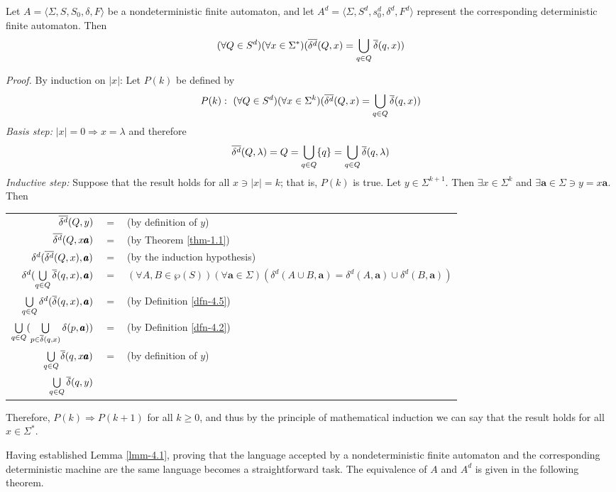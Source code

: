 \begin{lmm}\label{lmm-4.1}
Let $A=\langle\Sigma,S,S_0,\delta,F\rangle$ be a nondeterministic finite
automaton, and let $A^d=\langle\Sigma,S^d,s^d_0,\delta^d,F^d\rangle$ represent
the corresponding deterministic finite automaton. Then
\[ (\forall Q \in S^d)(\forall x \in \Sigma^*)(\overline{\delta^{d}}(Q,x) =
	\bigcup\limits_{q\in Q} \overline{\delta}(q,x)) \]

\emph{Proof.} By induction on $|x|$: Let $P(k)$ be defined by
\[ P(k):\ (\forall Q \in S^d)(\forall x \in \Sigma^k)(\overline{\delta^{d}}(Q,x) =
	\bigcup\limits_{q\in Q} \overline{\delta}(q,x)) \]
\emph{Basis step:} $|x| = 0 \Rightarrow x = \lambda$ and therefore
\[ \overline{\delta^{d}}(Q,\lambda) = Q = \bigcup\limits_{q\in Q}\{q\} = 
	\bigcup\limits_{q\in Q}\overline{\delta}(q,\lambda) \]
\emph{Inductive step:} Suppose that the result holds for all $x \ni |x| = k$;
that is, $P(k)$ is true. Let $y \in \Sigma^{k+1}$. Then $\exists x \in \Sigma^k$
and $\exists \pmb{a} \in \Sigma \ni y = x\pmb{a}$. Then
\begin{center}\begin{tabular}{rcl}
$\overline{\delta^{d}}(Q,y)$ & $=$ & (by definition of $y$) \\
$\overline{\delta^{d}}(Q,x\pmb{a})$ & $=$ & (by Theorem \ref{thm-1.1}) \\
$\delta^d(\overline{\delta^{d}}(Q,x),\pmb{a})$ & $=$ & (by the induction hypothesis) \\
$\delta^d(\bigcup\limits_{q\in Q}\overline{\delta}(q,x),\pmb{a})$ & $=$ & $(\forall A,B
	\in \wp(S))(\forall\pmb{a}\in\Sigma)(\delta^d(A \cup B,\pmb{a}) =
	\delta^d(A,\pmb{a}) \cup \delta^d(B,\pmb{a}))$ \\
$\bigcup\limits_{q\in Q}\delta^d(\overline{\delta}(q,x),\pmb{a})$ & $=$ &
	(by Definition \ref{dfn-4.5}) \\
$\bigcup\limits_{q\in Q}(\bigcup\limits_{p\in \overline{\delta}(q,x)}\delta
	(p,\pmb{a}))$ & $=$ & (by Definition \ref{dfn-4.2}) \\
$\bigcup\limits_{q\in Q}\overline{\delta}(q,x\pmb{a})$ & $=$ & (by definition of $y$) \\
$\bigcup\limits_{q\in Q} \overline{\delta}(q,y)$ &&
\end{tabular}\end{center}
Therefore, $P(k) \Rightarrow P(k+1)$ for all $k \geq 0$, and thus by the
principle of mathematical induction we can say that the result holds for all
$x \in \Sigma^*$.
\end{lmm}

Having established Lemma \ref{lmm-4.1}, proving that the language accepted by a
nondeterministic finite automaton and the corresponding deterministic machine
are the same language becomes a straightforward task. The equivalence of $A$ and
$A^d$ is given in the following theorem.


